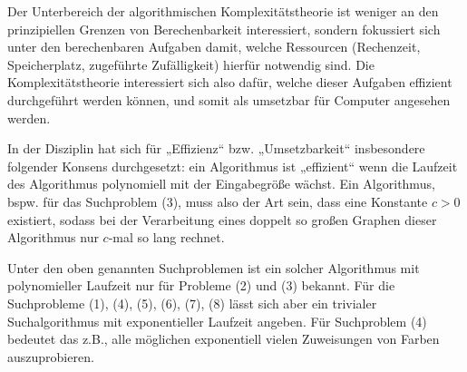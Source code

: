 Der Unterbereich der algorithmischen Komplexitätstheorie ist weniger an den prinzipiellen Grenzen von Berechenbarkeit interessiert, sondern fokussiert sich unter den berechenbaren Aufgaben damit, welche Ressourcen (Rechenzeit, Speicherplatz, zugeführte Zufälligkeit) hierfür notwendig sind. Die Komplexitätstheorie interessiert sich also dafür, welche dieser Aufgaben effizient durchgeführt werden können, und somit als umsetzbar für Computer angesehen werden. 

In der Disziplin hat sich für „Effizienz“ bzw. „Umsetzbarkeit“ insbesondere folgender Konsens durchgesetzt: ein Algorithmus ist „effizient“ wenn die Laufzeit des Algorithmus polynomiell mit der Eingabegröße wächst. Ein Algorithmus, bspw. für das Suchproblem (3), muss also der Art sein, dass eine Konstante $c>0$ existiert, sodass bei der Verarbeitung eines doppelt so großen Graphen dieser Algorithmus nur $c$-mal so lang rechnet.

\pagebreak
Unter den oben genannten Suchproblemen ist ein solcher Algorithmus mit polynomieller Laufzeit nur für Probleme (2) und (3) bekannt.
Für die Suchprobleme (1), (4), (5), (6), (7), (8) lässt sich aber ein trivialer Suchalgorithmus mit exponentieller Laufzeit angeben. Für Suchproblem (4) bedeutet das z.B., alle möglichen exponentiell vielen Zuweisungen von Farben auszuprobieren.

